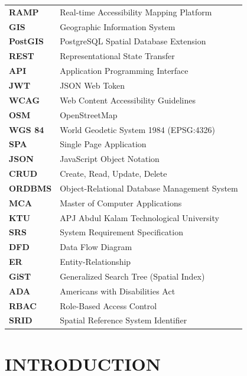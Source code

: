\documentclass[12pt,a4paper]{report}
\begin{document}
\noindent
\begin{tabular}{p{3cm}p{12cm}}
\textbf{RAMP} & Real-time Accessibility Mapping Platform \\
\textbf{GIS} & Geographic Information System \\
\textbf{PostGIS} & PostgreSQL Spatial Database Extension \\
\textbf{REST} & Representational State Transfer \\
\textbf{API} & Application Programming Interface \\
\textbf{JWT} & JSON Web Token \\
\textbf{WCAG} & Web Content Accessibility Guidelines \\
\textbf{OSM} & OpenStreetMap \\
\textbf{WGS 84} & World Geodetic System 1984 (EPSG:4326) \\
\textbf{SPA} & Single Page Application \\
\textbf{JSON} & JavaScript Object Notation \\
\textbf{CRUD} & Create, Read, Update, Delete \\
\textbf{ORDBMS} & Object-Relational Database Management System \\
\textbf{MCA} & Master of Computer Applications \\
\textbf{KTU} & APJ Abdul Kalam Technological University \\
\textbf{SRS} & System Requirement Specification \\
\textbf{DFD} & Data Flow Diagram \\
\textbf{ER} & Entity-Relationship \\
\textbf{GiST} & Generalized Search Tree (Spatial Index) \\
\textbf{ADA} & Americans with Disabilities Act \\
\textbf{RBAC} & Role-Based Access Control \\
\textbf{SRID} & Spatial Reference System Identifier
\end{tabular}

\newpage
{}
\setcounter{page}{1}

\chapter{INTRODUCTION}
\end{document}
